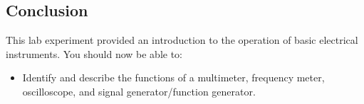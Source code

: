 \subsection*{Conclusion}
This lab experiment provided an introduction to the operation of basic electrical instruments. You should now be able to:

\begin{itemize}
    \item Identify and describe the functions of a multimeter, frequency meter, oscilloscope, and signal generator/function generator.
\end{itemize}

\newpage 
